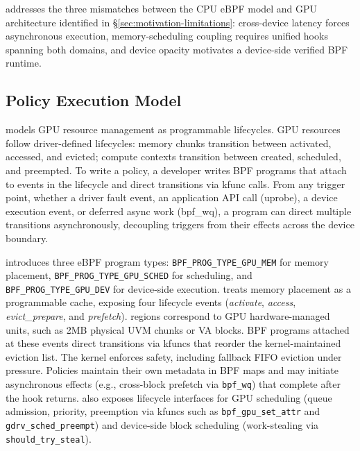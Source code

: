 
\sys{} addresses the three mismatches between the CPU eBPF model and GPU architecture identified in \S\ref{sec:motivation-limitations}: cross-device latency forces asynchronous execution, memory-scheduling coupling requires unified hooks spanning both domains, and device opacity motivates a device-side verified BPF runtime.

\subsection{\sys{} Policy Execution Model}
\label{sec:design-interfaces}

\sys{} models GPU resource management as programmable lifecycles. GPU resources follow driver-defined lifecycles: memory chunks transition between activated, accessed, and evicted; compute contexts transition between created, scheduled, and preempted. To write a policy, a developer writes BPF programs that attach to events in the lifecycle and direct transitions via kfunc calls. From any trigger point, whether a driver fault event, an application API call (uprobe), a device execution event, or deferred async work (bpf\_wq), a program can direct multiple transitions asynchronously, decoupling triggers from their effects across the device boundary.

\sys{} introduces three eBPF program types: \texttt{BPF\_PROG\_TYPE\_GPU\_MEM} for memory placement, \texttt{BPF\_PROG\_TYPE\_GPU\_SCHED} for scheduling, and \texttt{BPF\_PROG\_TYPE\_GPU\_DEV} for device-side execution. \sys treats memory placement as a programmable cache, exposing four lifecycle events (\emph{activate}, \emph{access}, \emph{evict\_prepare}, and \emph{prefetch}). \sys regions correspond to GPU hardware-managed units, such as 2MB physical UVM chunks or VA blocks. BPF programs attached at these events direct transitions via kfuncs that reorder the kernel-maintained eviction list. The kernel enforces safety, including fallback FIFO eviction under pressure. Policies maintain their own metadata in BPF maps and may initiate asynchronous effects (e.g., cross-block prefetch via \texttt{bpf\_wq}) that complete after the hook returns. \sys also exposes lifecycle interfaces for GPU scheduling (queue admission, priority, preemption via kfuncs such as \texttt{bpf\_gpu\_set\_attr} and \texttt{gdrv\_sched\_preempt}) and device-side block scheduling (work-stealing via \texttt{should\_try\_steal}).

